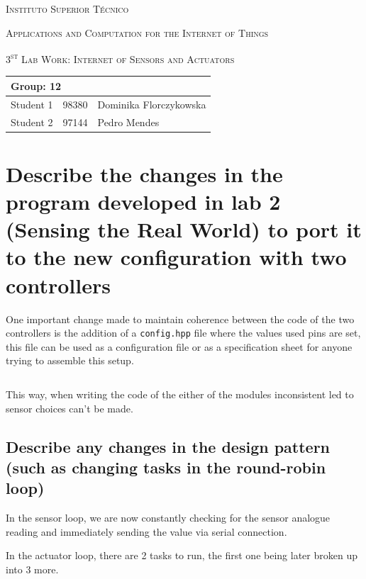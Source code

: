 \documentclass[10pt]{article}
\begin{document}
\begin{center}
    {\scshape Instituto Superior Técnico\par}
    \vspace{1cm}
    {\scshape\Large Applications and Computation for the Internet of Things\par}
    \vspace{1.5cm}
\end{center}
{\scshape\LARGE 3\textsuperscript{st} Lab Work: Internet of Sensors and Actuators}
\\
\begin{table}[h!]
    \centering
    \begin{tabular}{|l|l|p{10cm}|}
        \hline
        \multicolumn{3}{|l|}{Group: 12} \\[1.5ex] \hline
        Student 1 & 98380 & Dominika Florczykowska \\ [1.5ex]\hline
        Student 2 & 97144 & Pedro Mendes \\ [1.5ex]\hline
    \end{tabular}
\end{table}

\section{Describe the changes in the program developed in lab 2 (Sensing the
Real World) to port it to the new configuration with two controllers}

One important change made to maintain coherence between the code of the two
controllers is the addition of a \texttt{config.hpp} file where the values used
pins are set, this file can be used as a configuration file or as a
specification sheet for anyone trying to assemble this setup.

\inputminted{cpp}{../arduino/config.hpp}

This way, when writing the code of the either of the modules inconsistent led
to sensor choices can't be made.

\subsection{Describe any changes in the design pattern (such as changing
tasks in the round-robin loop)}\label{ss:design-pattern}

In the sensor loop, we are now constantly checking for the sensor analogue reading
and immediately sending the value via serial connection.

In the actuator loop, there are 2 tasks to run, the first one being later
broken up into 3 more.
\end{document}
